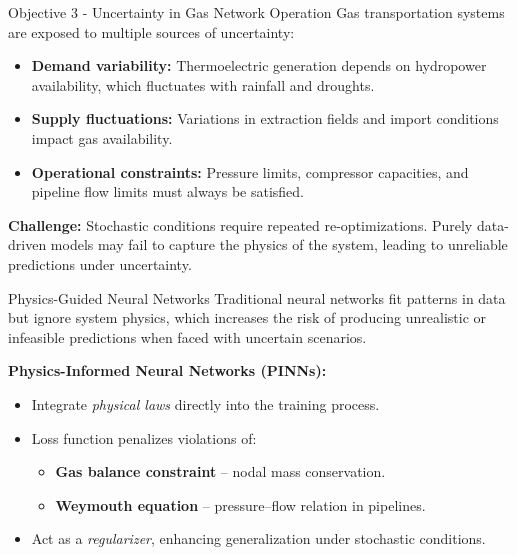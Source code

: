 \documentclass[hyperref={colorlinks,citecolor=blue,linkcolor=blue,urlcolor=blue}]{beamer}
\begin{document}
\begin{frame}{Objective 3 - Uncertainty in Gas Network Operation}
\small
\justifying
Gas transportation systems are exposed to multiple sources of uncertainty:
\begin{itemize}
    \item \textbf{Demand variability:} Thermoelectric generation depends on hydropower availability, which fluctuates with rainfall and droughts.
    \item \textbf{Supply fluctuations:} Variations in extraction fields and import conditions impact gas availability.
    \item \textbf{Operational constraints:} Pressure limits, compressor capacities, and pipeline flow limits must always be satisfied.
\end{itemize}

\medskip
\justifying
\textbf{Challenge:} Stochastic conditions require repeated re-optimizations. 
Purely data-driven models may fail to capture the physics of the system, 
leading to unreliable predictions under uncertainty.
\end{frame}



\begin{frame}{Physics-Guided Neural Networks}
\small
\justifying
Traditional neural networks fit patterns in data but ignore system physics, 
which increases the risk of producing unrealistic or infeasible predictions 
when faced with uncertain scenarios.

\medskip
\textbf{Physics-Informed Neural Networks (PINNs):}
\begin{itemize}
    \item Integrate \emph{physical laws} directly into the training process.
    \item Loss function penalizes violations of:
    \begin{itemize}
        \item \textbf{Gas balance constraint} – nodal mass conservation.
        \item \textbf{Weymouth equation} – pressure–flow relation in pipelines.
    \end{itemize}
    \item Act as a \emph{regularizer}, enhancing generalization under stochastic conditions.
\end{itemize}
\end{frame}
\end{document}

